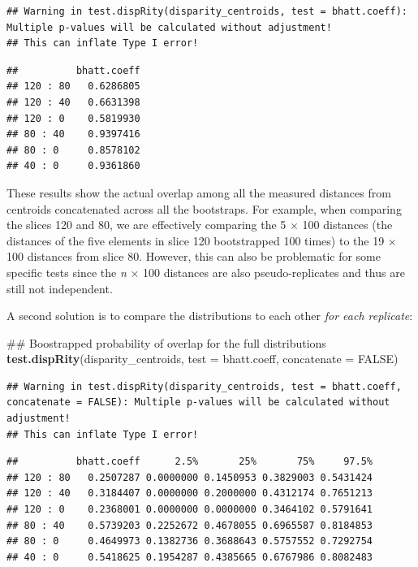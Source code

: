\documentclass[]{book}
\newenvironment{Shaded}{\begin{snugshade}}{\end{snugshade}}
\newcommand{\KeywordTok}[1]{\textcolor[rgb]{0.13,0.29,0.53}{\textbf{#1}}}
\newcommand{\DataTypeTok}[1]{\textcolor[rgb]{0.13,0.29,0.53}{#1}}
\newcommand{\OtherTok}[1]{\textcolor[rgb]{0.56,0.35,0.01}{#1}}
\newcommand{\NormalTok}[1]{#1}
\theoremstyle{definition}
\theoremstyle{definition}
\theoremstyle{definition}
\theoremstyle{remark}
\begin{document}
\begin{verbatim}
## Warning in test.dispRity(disparity_centroids, test = bhatt.coeff): Multiple p-values will be calculated without adjustment!
## This can inflate Type I error!
\end{verbatim}

\begin{verbatim}
##          bhatt.coeff
## 120 : 80   0.6286805
## 120 : 40   0.6631398
## 120 : 0    0.5819930
## 80 : 40    0.9397416
## 80 : 0     0.8578102
## 40 : 0     0.9361860
\end{verbatim}

These results show the actual overlap among all the measured distances
from centroids concatenated across all the bootstraps. For example, when
comparing the slices 120 and 80, we are effectively comparing the 5
\(\times\) 100 distances (the distances of the five elements in slice
120 bootstrapped 100 times) to the 19 \(\times\) 100 distances from
slice 80. However, this can also be problematic for some specific tests
since the \emph{n} \(\times\) 100 distances are also pseudo-replicates
and thus are still not independent.

A second solution is to compare the distributions to each other
\emph{for each replicate}:

\begin{Shaded}
\begin{Highlighting}[]
\NormalTok{## Boostrapped probability of overlap for the full distributions}
\KeywordTok{test.dispRity}\NormalTok{(disparity_centroids, }\DataTypeTok{test =}\NormalTok{ bhatt.coeff, }\DataTypeTok{concatenate =} \OtherTok{FALSE}\NormalTok{)}
\end{Highlighting}
\end{Shaded}

\begin{verbatim}
## Warning in test.dispRity(disparity_centroids, test = bhatt.coeff, concatenate = FALSE): Multiple p-values will be calculated without adjustment!
## This can inflate Type I error!
\end{verbatim}

\begin{verbatim}
##          bhatt.coeff      2.5%       25%       75%     97.5%
## 120 : 80   0.2507287 0.0000000 0.1450953 0.3829003 0.5431424
## 120 : 40   0.3184407 0.0000000 0.2000000 0.4312174 0.7651213
## 120 : 0    0.2368001 0.0000000 0.0000000 0.3464102 0.5791641
## 80 : 40    0.5739203 0.2252672 0.4678055 0.6965587 0.8184853
## 80 : 0     0.4649973 0.1382736 0.3688643 0.5757552 0.7292754
## 40 : 0     0.5418625 0.1954287 0.4385665 0.6767986 0.8082483
\end{verbatim}
\end{document}
